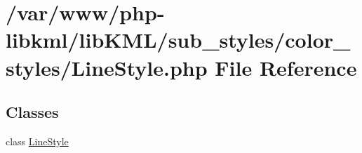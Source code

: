 \hypertarget{LineStyle_8php}{
\section{/var/www/php-\/libkml/libKML/sub\_\-styles/color\_\-styles/LineStyle.php File Reference}
\label{da/db2/LineStyle_8php}
}
\subsection*{Classes}
\begin{DoxyCompactItemize}
\item 
class \hyperlink{classLineStyle}{LineStyle}
\end{DoxyCompactItemize}
